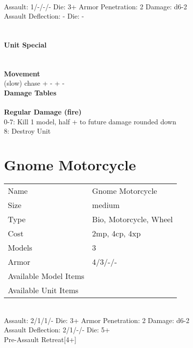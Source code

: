 \ \\
Assault: 1/-/-/- Die: 3+ Armor Penetration: 2 Damage: d6-2 \\
Assault Deflection: - Die: -\\
\indent  \\
\ \\

{\bf Unit Special} \\

\ \\


\ \\ {\bf Movement } \\
(slow) chase + - + - \\



{\bf Damage Tables} \\
\ \\ {\bf Regular Damage (fire) } \\
0-7: Kill 1 model, half + to future damage rounded down \\
8: Destroy Unit \\









\pagebreak

\section{ Gnome Motorcycle }

\begin{tabular}{ll}
  Name & Gnome Motorcycle \\
  Size & medium\\
  Type & Bio, Motorcycle, Wheel\\
  Cost & 2mp, 4cp, 4xp\\
  Models & 3\\
  Armor & 4/3/-/-\\
  Available Model Items &  \\
  Available Unit Items &  \\
\end{tabular}

\ \\
Assault: 2/1/1/- Die: 3+ Armor Penetration: 2 Damage: d6-2 \\
Assault Deflection: 2/1/-/- Die: 5+\\
\indent Pre-Assault Retreat[4+] \\
\ \\

